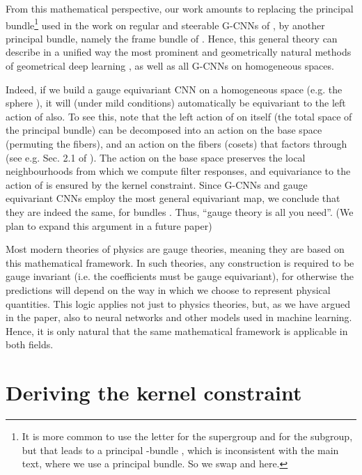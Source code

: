 \documentclass{article}
\begin{document}
From this mathematical perspective, our work amounts to replacing the principal  bundle\footnote{It is more common to use the letter  for the supergroup and  for the subgroup, but that leads to a principal -bundle , which is inconsistent with the main text, where we use a principal  bundle. So we swap  and  here.}  used in the work on regular and steerable G-CNNs of \citet{cohenGeneralTheoryEquivariant2018,cohenIntertwinersInducedRepresentations2018}, by another principal  bundle, namely the frame bundle of .
Hence, this general theory can describe in a unified way the most prominent and geometrically natural methods of geometrical deep learning \cite{masciGeodesicConvolutionalNeural2015, boscainiLearningShapeCorrespondence2016}, as well as all G-CNNs on homogeneous spaces.

Indeed, if we build a gauge equivariant CNN on a homogeneous space  (e.g. the sphere ), it will (under mild conditions) automatically be equivariant to the left action of  also.
To see this, note that the left action of  on itself (the total space of the principal  bundle) can be decomposed into an action on the base space  (permuting the fibers), and an action on the fibers (cosets) that factors through  (see e.g. Sec. 2.1 of \cite{cohenIntertwinersInducedRepresentations2018}).
The action on the base space preserves the local neighbourhoods from which we compute filter responses, and equivariance to the action of  is ensured by the kernel constraint. 
Since G-CNNs \cite{cohenGeneralTheoryEquivariant2018} and gauge equivariant CNNs employ the most general equivariant map, we conclude that they are indeed the same, for bundles .
Thus, ``gauge theory is all you need''.
(We plan to expand this argument in a future paper)

Most modern theories of physics are gauge theories, meaning they are based on this mathematical framework.
In such theories, any construction is required to be gauge invariant (i.e. the coefficients must be gauge equivariant), for otherwise the predictions will depend on the way in which we choose to represent physical quantities.
This logic applies not just to physics theories, but, as we have argued in the paper, also to neural networks and other models used in machine learning.
Hence, it is only natural that the same mathematical framework is applicable in both fields.

\section{Deriving the kernel constraint}
\end{document}

